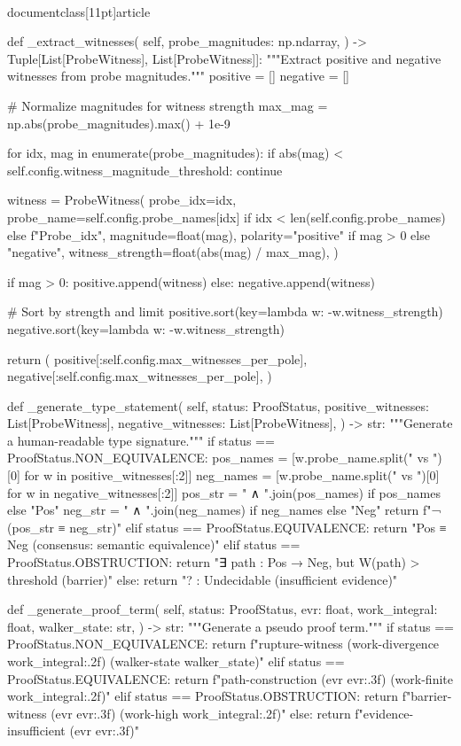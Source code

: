 \\documentclass[11pt]{article}
\begin{document}
\begin{CodeBlock}
    def _extract_witnesses(
        self,
        probe_magnitudes: np.ndarray,
    ) -> Tuple[List[ProbeWitness], List[ProbeWitness]]:
        """Extract positive and negative witnesses from probe magnitudes."""
        positive = []
        negative = []

        # Normalize magnitudes for witness strength
        max_mag = np.abs(probe_magnitudes).max() + 1e-9

        for idx, mag in enumerate(probe_magnitudes):
            if abs(mag) < self.config.witness_magnitude_threshold:
                continue

            witness = ProbeWitness(
                probe_idx=idx,
                probe_name=self.config.probe_names[idx] if idx < len(self.config.probe_names) else f"Probe_{idx}",
                magnitude=float(mag),
                polarity="positive" if mag > 0 else "negative",
                witness_strength=float(abs(mag) / max_mag),
            )

            if mag > 0:
                positive.append(witness)
            else:
                negative.append(witness)

        # Sort by strength and limit
        positive.sort(key=lambda w: -w.witness_strength)
        negative.sort(key=lambda w: -w.witness_strength)

        return (
            positive[:self.config.max_witnesses_per_pole],
            negative[:self.config.max_witnesses_per_pole],
        )

    def _generate_type_statement(
        self,
        status: ProofStatus,
        positive_witnesses: List[ProbeWitness],
        negative_witnesses: List[ProbeWitness],
    ) -> str:
        """Generate a human-readable type signature."""
        if status == ProofStatus.NON_EQUIVALENCE:
            pos_names = [w.probe_name.split(" vs ")[0] for w in positive_witnesses[:2]]
            neg_names = [w.probe_name.split(" vs ")[0] for w in negative_witnesses[:2]]
            pos_str = " ∧ ".join(pos_names) if pos_names else "Pos"
            neg_str = " ∧ ".join(neg_names) if neg_names else "Neg"
            return f"¬ ({pos_str} ≡ {neg_str})"
        elif status == ProofStatus.EQUIVALENCE:
            return "Pos ≡ Neg  (consensus: semantic equivalence)"
        elif status == ProofStatus.OBSTRUCTION:
            return "∃ path : Pos → Neg, but W(path) > threshold  (barrier)"
        else:
            return "? : Undecidable  (insufficient evidence)"

    def _generate_proof_term(
        self,
        status: ProofStatus,
        evr: float,
        work_integral: float,
        walker_state: str,
    ) -> str:
        """Generate a pseudo proof term."""
        if status == ProofStatus.NON_EQUIVALENCE:
            return f"rupture-witness (work-divergence {work_integral:.2f}) (walker-state {walker_state})"
        elif status == ProofStatus.EQUIVALENCE:
            return f"path-construction (evr {evr:.3f}) (work-finite {work_integral:.2f})"
        elif status == ProofStatus.OBSTRUCTION:
            return f"barrier-witness (evr {evr:.3f}) (work-high {work_integral:.2f})"
        else:
            return f"evidence-insufficient (evr {evr:.3f})"


\end{CodeBlock}
\end{document}
